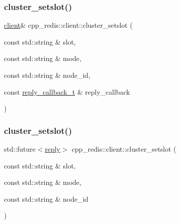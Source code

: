 \subsubsection{\texorpdfstring{cluster\+\_\+setslot()}{cluster\_setslot()}\hspace{0.1cm}{\footnotesize\ttfamily [3/4]}}
{\footnotesize\ttfamily \hyperlink{classcpp__redis_1_1client}{client}\& cpp\+\_\+redis\+::client\+::cluster\+\_\+setslot (\begin{DoxyParamCaption}\item[{const std\+::string \&}]{slot,  }\item[{const std\+::string \&}]{mode,  }\item[{const std\+::string \&}]{node\+\_\+id,  }\item[{const \hyperlink{classcpp__redis_1_1client_a061a1140d36d2eaeda82b09a0bb3f9f2}{reply\+\_\+callback\+\_\+t} \&}]{reply\+\_\+callback }\end{DoxyParamCaption})}

\mbox{\label{classcpp__redis_1_1client_a824c1234198e48badeccf4190b610e32}} 
\subsubsection{\texorpdfstring{cluster\+\_\+setslot()}{cluster\_setslot()}\hspace{0.1cm}{\footnotesize\ttfamily [4/4]}}
{\footnotesize\ttfamily std\+::future$<$\hyperlink{classcpp__redis_1_1reply}{reply}$>$ cpp\+\_\+redis\+::client\+::cluster\+\_\+setslot (\begin{DoxyParamCaption}\item[{const std\+::string \&}]{slot,  }\item[{const std\+::string \&}]{mode,  }\item[{const std\+::string \&}]{node\+\_\+id }\end{DoxyParamCaption})}

\mbox{\label{classcpp__redis_1_1client_ac03fb62a9eb5abbb5248bc38fd4dfb5e}} 

